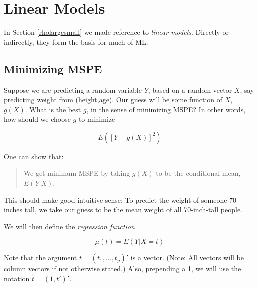\chapter{Linear Models}  
\label{chap:linmod}   

In Section \ref{rholargesmall} we made reference to \textit{linear
models}.  Directly or indirectly, they form the basis for much of ML.

\section{Minimizing MSPE}

Suppose we are predicting a random variable $Y$, based on a random
vector $X$, say predicting weight from (height,age).  Our guess will be
some function of $X$, $g(X)$.  What is the best $g$, in the sense of
minimizing MSPE?  In other words, how should we choose $g$ to minimize

\begin{equation}
\label{mspe}
E \left ( [Y - g(X)]^2 \right )
\end{equation}

% 
% 

One can show that:

\begin{quote}
We get minimum MSPE by taking $g(X)$ to be the conditional mean, $E(Y|X)$.
\end{quote}

This should make good intuitive sense:  To predict the weight of
someone 70 inches tall, we take our guess to be the mean weight of all
70-inch-tall people.

We will then define the \textit{regression function}

\begin{equation}
\mu(t) = E (Y | X = t)
\end{equation}

Note that the argument $t = (t_1,...,t_p)'$ is a vector.  (Note:  All
vectors will be column vectors if not otherwise stated.)
Also, prepending a 1, we will use the notation $\widetilde{t} = (1,t')'$.

